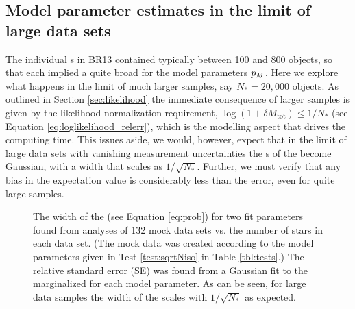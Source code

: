 \subsection{Model parameter estimates in the limit of large data sets} \label{sec:largedata}

The individual \MAP{}s in BR13 contained typically between 100 and 800 objects, so that each \MAP{} implied a quite broad \pdf{} for the model parameters $p_M{}$. Here we explore what happens in the limit of much larger samples, say $N_{*} = 20,000$ objects. As outlined in Section \ref{sec:likelihood} the immediate consequence of larger samples is given by the likelihood normalization requirement, $\log(1+\delta M_\text{tot})\le 1/N_{*}$ (see Equation \ref{eq:loglikelihood_relerr}), which is the modelling aspect that drives the computing time. This issues aside, we would, however, expect that in the limit of large data sets with vanishing measurement uncertainties the \pdf{}s of the \pmodel{} become Gaussian, with a \pdf{} width that scales as $1/\sqrt{N_{*}}$. Further, we must verify that any bias in the \pdf{} expectation value is considerably less than the error, even for quite large samples.



\begin{figure}[!htbp]
\caption{The width of the \pdf{} (see Equation \ref{eq:prob}) for two fit parameters found from analyses of 132 mock data sets vs. the number of stars in each data set. (The mock data was created according to the model parameters given in Test \ref{test:sqrtNiso} in Table \ref{tbl:tests}.) The relative standard error (SE) was found from a Gaussian fit to the marginalized \pdf{} for each model parameter. As can be seen, for large data samples the width of the \pdf{} scales with $1/\sqrt{N_{*}}$ as expected.} 
\label{fig:sqrtNiso}
\end{figure}




